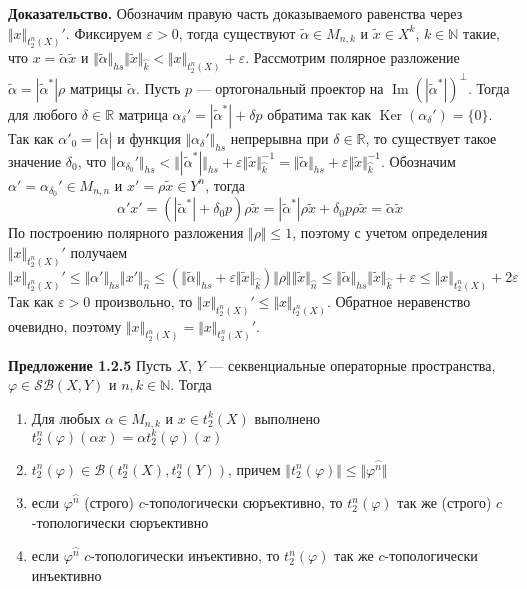 \documentclass[12pt]{article}
\begin{document}
{\bf Доказательство.} Обозначим правую часть доказываемого равенства через
$\Vert x\Vert_{t_2^n(X)}'$. Фиксируем $\varepsilon>0$, тогда существуют
$\tilde{\alpha}\in M_{n,k}$ и $\tilde{x}\in X^{k}$, $k\in\mathbb{N}$ такие, что
$x=\tilde{\alpha}\tilde{x}$ и
$\Vert\tilde{\alpha}\Vert_{hs}\Vert\tilde{x}\Vert_{\wideparen{k}}<\Vert
x\Vert_{t_2^n(X)}+\varepsilon$. Рассмотрим полярное разложение
$\tilde{\alpha}=|\tilde{\alpha}^*| \rho$ матрицы $\tilde{\alpha}$. Пусть $p$ ---
ортогональный проектор на $\operatorname{Im}{(|\tilde{\alpha}^*|)}^\perp$. Тогда
для любого $\delta\in\mathbb{R}$ матрица
$\alpha_\delta'=|\tilde{\alpha}^*|+\delta p$ обратима так как
$\operatorname{Ker}(\alpha_\delta')= \{0 \}$. Так как $\alpha'_0=|\tilde{\alpha}|$
и функция $\Vert\alpha_\delta'\Vert_{hs}$ непрерывна при $\delta\in\mathbb{R}$,
то существует такое значение $\delta_0$, что
$\Vert\alpha_{\delta_0}'\Vert_{hs}
<\Vert|\tilde{\alpha}^*|\Vert_{hs}+\varepsilon\Vert
\tilde{x}\Vert_{\wideparen{k}}^{-1}
=\Vert\tilde{\alpha}\Vert_{hs}+\varepsilon\Vert
\tilde{x}\Vert_{\wideparen{k}}^{-1}$. Обозначим 
$\alpha'=\alpha_{\delta_0}'\in M_{n,n}$ и $x'=\rho\tilde{x}\in Y^n$, тогда 
$$
\alpha'x'
=(|\tilde{\alpha}^*|+\delta_0 p)\rho \tilde{x}
=|\tilde{\alpha}^*|\rho \tilde{x}+\delta_0 p\rho \tilde{x}
=\tilde{\alpha}\tilde{x}
$$
По построению полярного разложения $\Vert \rho\Vert\leq 1$, поэтому с учетом
определения $\Vert x\Vert_{t_2^n(X)}'$ получаем
$$
\Vert x\Vert_{t_2^n(X)}'\leq
\Vert\alpha'\Vert_{hs}\Vert x'\Vert_{\wideparen{n}}
\leq (
    \Vert\tilde{\alpha}\Vert_{hs}+
    \varepsilon\Vert 
        \tilde{x}\Vert_{\wideparen{k}})
    \Vert \rho\Vert\Vert\tilde{x}\Vert_{\wideparen{n}}
\leq\Vert\tilde{\alpha}\Vert_{hs}\Vert\tilde{x}\Vert_{\wideparen{k}}
+\varepsilon
\leq \Vert x\Vert_{t_2^n(X)}+2\varepsilon
$$
Так как $\varepsilon>0$ произвольно, то $\Vert x\Vert_{t_2^n(X)}'\leq\Vert
x\Vert_{t_2^n(X)}$. Обратное неравенство очевидно, поэтому $\Vert
x\Vert_{t_2^n(X)}=\Vert x\Vert_{t_2^n(X)}'$.

\medskip

{\bf Предложение 1.2.5}\label{PrT2nOfOpIsWellDef} Пусть $X$, $Y$ ---
секвенциальные операторные пространства, $\varphi\in\mathcal{SB}(X,Y)$ и
$n,k\in\mathbb{N}$. Тогда 
\begin{enumerate}[label = (\roman*)]
    \item Для любых $\alpha\in M_{n,k}$ и $x\in t_2^k(X)$ выполнено
    $t_2^n(\varphi)(\alpha x)=\alpha t_2^k(\varphi)(x)$

    \item $t_2^n(\varphi)\in\mathcal{B}(t_2^n(X),t_2^n(Y))$, причем $\Vert
    t_2^n(\varphi)\Vert\leq\Vert\varphi^{\wideparen{n}}\Vert$

    \item если $\varphi^{\wideparen{n}}$ (строго) $c$-топологически
    сюръективно, то $t_2^n(\varphi)$ так же (строго) $c$-топологически
    сюръективно

    \item если $\varphi^{\wideparen{n}}$ $c$-топологически инъективно, то
    $t_2^n(\varphi)$ так же $c$-топологически инъективно
\end{enumerate}
\end{document}
